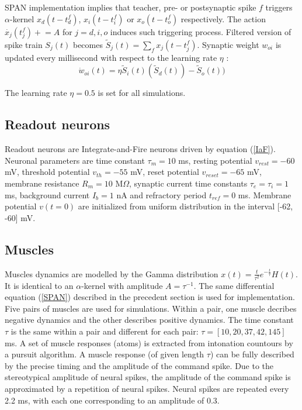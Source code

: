 \documentclass[11pt, a4paper]{article} %
\begin{document}
SPAN implementation implies that teacher, pre- or postsynaptic spike $f$ triggers $\alpha$-kernel $x_d(t-t_d^f)$, $x_i(t-t_i^f)$ or $x_o(t-t_o^f)$ respectively. The action $\dot{x_{j}}(t_{j}^f) \mathrel{+} = A$ for $j = d,i,o$ induces such triggering process. Filtered version of spike train $S_j(t)$ becomes $\widetilde{S}_j(t) = \sum\limits_f x_j(t-t_j^f)$. Synaptic weight $w_{oi}$ is updated every millisecond with respect to the learning rate $\eta$ : \begin{equation}
\dot{w}_{oi}(t) = \eta \widetilde{S}_i(t)(\widetilde{S}_d(t)) - \widetilde{S}_o(t))
\end{equation}

The learning rate $\eta = 0.5$ is set for all simulations.

\subsection{Readout neurons}
Readout neurons are Integrate-and-Fire neurons driven by equation (\ref{IaF}). Neuronal parameters are time constant $\tau_m = 10$ ms, resting potential $v_{rest} = -60$ mV, threshold potential $v_{th} = -55$ mV, reset potential $v_{reset} = -65$ mV, membrane resistance $R_m = 10$ M$\Omega$, synaptic current time constants $\tau_e = \tau_i = 1$ ms, background current $I_b = 1$ nA and refractory period $t_{ref} = 0$ ms. Membrane potential $v(t=0)$ are initialized from uniform distribution in the interval [-62, -60] mV.

\subsection{Muscles}
Muscles dynamics are modelled by the Gamma distribution $x(t) = \frac{t}{\tau^2} e^{-\frac{t}{\tau}} H(t)$. It is identical to an $\alpha$-kernel with amplitude $A = \tau^{-1}$. The same differential equation (\ref{SPAN}) described in the precedent section is used for implementation. Five pairs of muscles are used for simulations. Within a pair, one muscle decribes negative dynamics and the other describes positive dynamics. The time constant $\tau$ is the same within a pair and different for each pair: $\tau = [10, 20, 37, 42, 145]$ ms. A set of muscle responses (atoms) is extracted from intonation countours by a pursuit algorithm. A muscle response (of given length $\tau$) can be fully described by the precise timing and the amplitude of the command spike. Due to the stereotypical amplitude of neural spikes, the amplitude of the command spike is approximated by a repetition of neural spikes. Neural spikes are repeated every 2.2 ms, with each one corresponding to an amplitude of 0.3.
\end{document}
